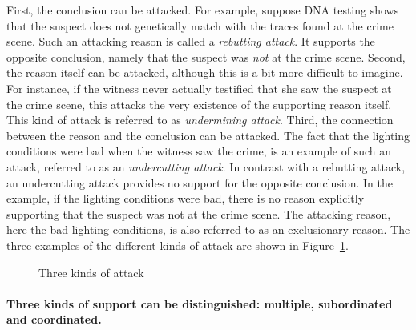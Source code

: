 \documentclass[10pt]{article}
\begin{document}
First, the conclusion can be attacked. %
For example, suppose DNA testing shows that the suspect does not genetically match 
with the traces found at the crime scene. 
Such an attacking reason is called a \textit{rebutting attack}.  
It supports the opposite conclusion, namely that the suspect was \textit{not} 
at the crime scene. 
%
Second, the reason itself can be attacked, although this is a bit more difficult to imagine.  
 For instance, %
 if the witness never actually testified that she saw the suspect at the crime scene, this attacks the very 
 existence of the supporting reason itself. 
 This kind of attack is referred to as \textit{undermining attack}. 
%
Third, the connection between the reason and the conclusion can be attacked.
 The fact that the lighting conditions were bad when the witness saw the crime, 
 is an example of such an attack, referred to as an \textit{undercutting attack}.
 In contrast with a rebutting attack, an undercutting attack provides no support for the opposite conclusion. In the example, %
 if the lighting conditions were bad, there is no reason explicitly 
 supporting that the suspect was not at the crime scene. The attacking reason, %
 here the bad lighting conditions, is also referred to as an exclusionary reason. 
%
The three examples of the different kinds of attack are shown in Figure~\ref{fig:arg3}.

\begin{figure}[bt]
\centering

\caption{Three kinds of attack\label{fig:arg3}}
\end{figure}

\paragraph{Three kinds of support can be distinguished: multiple, subordinated and coordinated.}

\end{document}
